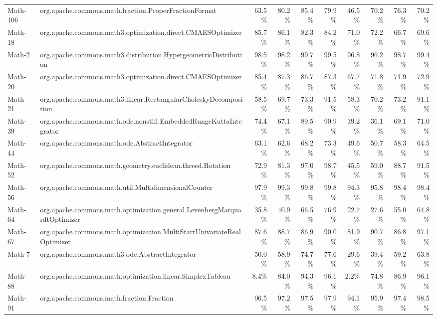 \begin{tabular}{ ll rrrr rrrr}
Math-106 &  org.apache.commons.math.fraction.ProperFractionFormat &  63.5\% &  80.2\% &  85.4\% &  79.9\% &  46.5\% &  70.2\% &  76.3\% &  70.2\%\\ 
Math-18 &  org.apache.commons.math3.optimization.direct.CMAESOptimizer &  85.7\% &  86.1\% &  82.3\% &  84.2\% &  71.0\% &  72.2\% &  66.7\% &  69.6\%\\ 
Math-2 &  org.apache.commons.math3.distribution.HypergeometricDistribution &  98.5\% &  98.2\% &  99.7\% &  99.5\% &  96.8\% &  96.2\% &  98.7\% &  99.4\%\\ 
Math-20 &  org.apache.commons.math3.optimization.direct.CMAESOptimizer &  85.4\% &  87.3\% &  86.7\% &  87.3\% &  67.7\% &  71.8\% &  71.9\% &  72.9\%\\ 
Math-21 &  org.apache.commons.math3.linear.RectangularCholeskyDecomposition &  58.5\% &  69.7\% &  73.3\% &  91.5\% &  58.3\% &  70.2\% &  73.2\% &  91.1\%\\ 
Math-39 &  org.apache.commons.math.ode.nonstiff.EmbeddedRungeKuttaIntegrator &  74.4\% &  67.1\% &  89.5\% &  90.9\% &  39.2\% &  36.1\% &  69.1\% &  71.0\%\\ 
Math-44 &  org.apache.commons.math.ode.AbstractIntegrator &  63.1\% &  62.6\% &  68.2\% &  73.3\% &  49.6\% &  50.7\% &  58.3\% &  64.5\%\\ 
Math-52 &  org.apache.commons.math.geometry.euclidean.threed.Rotation &  72.9\% &  81.3\% &  97.0\% &  98.7\% &  45.5\% &  59.0\% &  88.7\% &  91.5\%\\ 
Math-56 &  org.apache.commons.math.util.MultidimensionalCounter &  97.9\% &  99.3\% &  99.8\% &  99.8\% &  94.3\% &  95.8\% &  98.4\% &  98.4\%\\ 
Math-64 &  org.apache.commons.math.optimization.general.LevenbergMarquardtOptimizer &  35.8\% &  40.9\% &  66.5\% &  76.9\% &  22.7\% &  27.6\% &  55.0\% &  64.8\%\\ 
Math-67 &  org.apache.commons.math.optimization.MultiStartUnivariateRealOptimizer &  87.6\% &  88.7\% &  86.9\% &  90.0\% &  81.9\% &  90.7\% &  86.8\% &  97.1\%\\ 
Math-7 &  org.apache.commons.math3.ode.AbstractIntegrator &  50.0\% &  58.9\% &  74.7\% &  77.6\% &  29.6\% &  39.4\% &  59.2\% &  63.8\%\\ 
Math-88 &  org.apache.commons.math.optimization.linear.SimplexTableau &  8.4\% &  84.0\% &  94.3\% &  96.1\% &  2.2\% &  74.8\% &  86.9\% &  96.1\%\\ 
Math-91 &  org.apache.commons.math.fraction.Fraction &  96.5\% &  97.2\% &  97.5\% &  97.9\% &  94.1\% &  95.9\% &  97.4\% &  98.5\%\\ 

\end{tabular}
